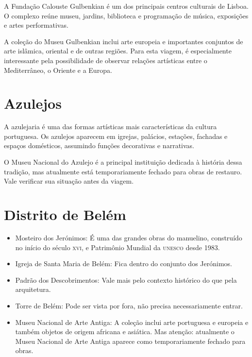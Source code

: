 A Fundação Calouste Gulbenkian é um dos principais centros culturais de Lisboa. O complexo reúne museu, jardins, biblioteca e programação de música, exposições e artes performativas.

A coleção do Museu Gulbenkian inclui arte europeia e importantes conjuntos de arte islâmica, oriental e de outras regiões. Para esta viagem, é especialmente interessante pela possibilidade de observar relações artísticas entre o Mediterrâneo, o Oriente e a Europa.

\chapter{Azulejos}

A azulejaria é uma das formas artísticas mais características da cultura portuguesa. Os azulejos aparecem em igrejas, palácios, estações, fachadas e espaços domésticos, assumindo funções decorativas e narrativas.

O Museu Nacional do Azulejo é a principal instituição dedicada à história dessa tradição, mas atualmente está temporariamente fechado para obras de restauro. Vale verificar sua situação antes da viagem.

\chapter{Distrito de Belém}

\begin{itemize}
\item Mosteiro dos Jerónimos: É uma das grandes obras do manuelino, construído no início do século \textsc{xvi}, e Patrimônio Mundial da \textsc{unesco} desde 1983.

\item Igreja de Santa Maria de Belém: Fica dentro do conjunto dos Jerónimos.

\item Padrão dos Descobrimentos: Vale mais pelo contexto histórico do que pela arquitetura.

\item Torre de Belém: Pode ser vista por fora, não precisa necessariamente entrar.

\item Museu Nacional de Arte Antiga: A coleção inclui arte portuguesa e europeia e também objetos de origem africana e asiática. Mas atenção: atualmente o Museu Nacional de Arte Antiga aparece como temporariamente fechado para obras.
\end{itemize}

